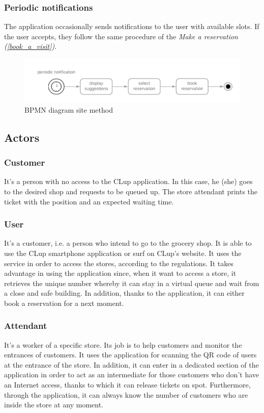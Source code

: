 \documentclass[table, 12pt]{article}
\begin{document}
\subsubsection{Periodic notifications}
The application occasionally sends notifications to the user with available slots. If the user accepts, they follow the same procedure of the \textit{Make a reservation (\ref{book_a_visit})}.
\begin{figure}[H]
    \begin{center}
        \includegraphics[scale=0.35]{assets/Functions/function-periodic-notifications.png}
        \caption{BPMN diagram site method}
    \end{center}
\end{figure}
\subsection{Actors}
\subsubsection{Customer}
It's a person with no access to the CLup application. In this case, he (she) goes to the desired shop and requests to be queued up. The store attendant prints the ticket with the position and an expected waiting time.
\subsubsection{User}
It's a customer, i.e. a person who intend to go to the grocery shop. It is able to use the CLup smartphone application or surf on CLup's website. It uses the service in order to access the stores, according to the regulations. It takes advantage in using the application since, when it want to access a store, it retrieves the unique number whereby it can stay in a virtual queue and wait from a close and safe building. In addition, thanks to the application, it can either book a reservation for a next moment.

\subsubsection{Attendant}
It's a worker of a specific store. Its job is to help customers and monitor the entrances of customers. It uses the application for scanning the QR code of users at the entrance of the store. In addition, it can enter in a dedicated section of the application in order to act as an intermediate for those customers who don't have an Internet access, thanks to which it can release tickets on spot. Furthermore, through the application, it can always know the number of customers who are inside the store at any moment.
\end{document}
